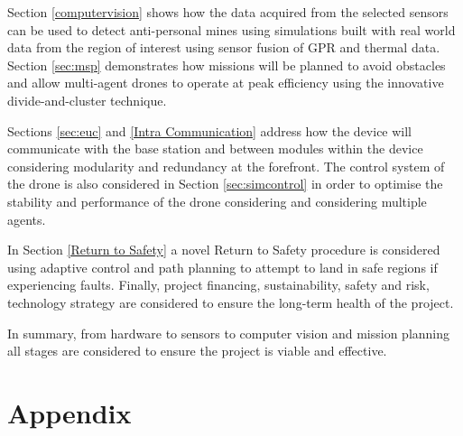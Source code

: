 \documentclass{report_template_oxford}
\begin{document}
Section \ref{computervision} shows how the data acquired from the selected sensors can be used to detect anti-personal mines using simulations built with real world data from the region of interest using sensor fusion of \gls{GPR} and thermal data. Section \ref{sec:msp} demonstrates how missions will be planned to avoid obstacles and allow multi-agent drones to operate at peak efficiency using the innovative divide-and-cluster technique. 

Sections \ref{sec:euc} and \ref{Intra Communication} address how the device will communicate with the base station and between modules within the device considering modularity and redundancy at the forefront. The control system of the drone is also considered in Section \ref{sec:simcontrol} in order to optimise the stability and performance of the drone considering and considering multiple agents. 

In Section \ref{Return to Safety} a novel Return to Safety procedure is considered using adaptive control and path planning to attempt to land in safe regions if experiencing faults. Finally, project financing, sustainability, safety and risk, technology strategy are considered to ensure the long-term health of the project. 

In summary, from hardware to sensors to computer vision and mission planning all stages are considered to ensure the project is viable and effective.


\newpage
{}
\section*{Appendix}
\end{document}
